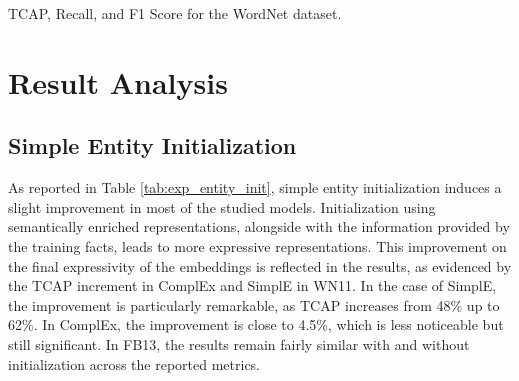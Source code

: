 \begin{table}
\caption{TCAP, Recall, and F1 Score for the WordNet dataset.} \label{tab:ookb_wn}

\caption{Top: (a) metrics obtained for the Freebase dataset. DBOnt refers to the DBpedia ontology, and GKGOnt to the Google Knowledge Graph Ontology. Bottom: (b) metrics obtained for the WordNet dataset. Entity initialization is used in all instances}
\label{tab:OOKB_exp}
\end{table}

\section{Result Analysis}\label{4_sec:results}
\subsection{Simple Entity Initialization}
As reported in Table \ref{tab:exp_entity_init}, simple entity initialization induces a slight improvement in most of the studied models. Initialization using semantically enriched representations, alongside with the information provided by the training facts, leads to more expressive representations. This improvement on the final expressivity of the embeddings is reflected in the results, as evidenced by the TCAP increment in ComplEx and SimplE in WN11. In the case of SimplE, the improvement is particularly remarkable, as TCAP increases from 48\% up to 62\%. In ComplEx, the improvement is close to 4.5\%, which is less noticeable but still significant. In FB13, the results remain fairly similar with and without initialization across the reported metrics.

